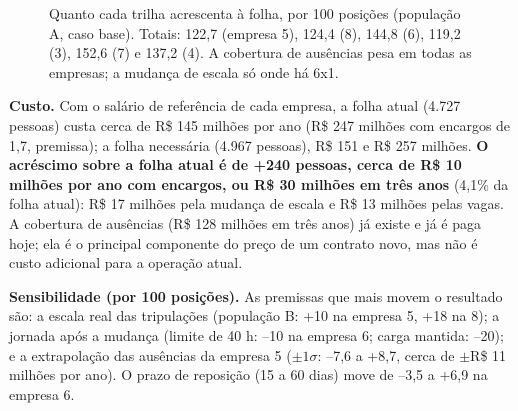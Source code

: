 \documentclass[11pt,a4paper]{article}
\begin{document}
\begin{figure}[htbp]
\centering
{}
\caption{Quanto cada trilha acrescenta à folha, por 100 posições (população A, caso base). Totais: 122,7 (empresa 5), 124,4 (8), 144,8 (6), 119,2 (3), 152,6 (7) e 137,2 (4). A cobertura de ausências pesa em todas as empresas; a mudança de escala só onde há 6x1.}
\end{figure}

\textbf{Custo.} Com o salário de referência de cada empresa, a folha atual (4.727 pessoas) custa cerca de R\$ 145 milhões por ano (R\$ 247 milhões com encargos de 1,7, premissa); a folha necessária (4.967 pessoas), R\$ 151 e R\$ 257 milhões. \textbf{O acréscimo sobre a folha atual é de +240 pessoas, cerca de R\$ 10 milhões por ano com encargos, ou R\$ 30 milhões em três anos} (4,1\% da folha atual): R\$ 17 milhões pela mudança de escala e R\$ 13 milhões pelas vagas. A cobertura de ausências (R\$ 128 milhões em três anos) já existe e já é paga hoje; ela é o principal componente do preço de um contrato novo, mas não é custo adicional para a operação atual.

\textbf{Sensibilidade (por 100 posições).} As premissas que mais movem o resultado são: a escala real das tripulações (população B: +10 na empresa 5, +18 na 8); a jornada após a mudança (limite de 40 h: --10 na empresa 6; carga mantida: --20); e a extrapolação das ausências da empresa 5 ($\pm1\sigma$: --7,6 a +8,7, cerca de $\pm$R\$ 11 milhões por ano). O prazo de reposição (15 a 60 dias) move de --3,5 a +6,9 na empresa 6.
\end{document}
